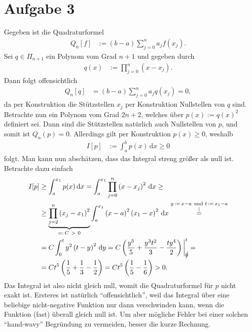 \documentclass[english, parskip=full]{scrartcl}
\newcommand{\kom}{}
\newcommand{\intx}{}
\newcommand{\kla}{}
\newcommand{\tecxt}{}
\begin{document}
\section*{Aufgabe 3}
Gegeben ist die Quadraturformel
\begin{align}
Q_{n}[f]&:= (b-a)\sum_{j=0}^{n}a_jf(x_j).
\end{align}
Sei $q\in\Pi_{n+1}$ ein Polynom vom Grad $n+1$ und gegeben durch 
\begin{align}
q(x) &:=\prod_{j=0}^n \kla\left( x - x_j \right).
\end{align}
Dann folgt offensichtlich
\begin{align}
Q_n[q] &= (b-a)\sum_{j=0}^n a_jq(x_j)  = 0,
\end{align}
da per Konstruktion die Stützstellen $x_j$ per Konstruktion Nullstellen von $q$ sind.
Betrachte nun ein Polynom vom Grad $2n+2$, welches über $p(x):=q(x)^2$ definiert sei.
Dann sind die Stützstellen natürlich auch Nullstellen von $p$, und somit ist $Q_n(p)=0$.
Allerdings gilt per Konstruktion $p(x)\ge 0$, weshalb
\begin{align}
I[p] &:= \intx\int_{a}^{b}p(x)\, \mathrm{d}x\ge 0
\end{align}
folgt.
Man kann nun abschätzen, dass das Integral streng größer als null ist.
Betrachte dazu einfach
\begin{align}
I[p]&\ge\intx\int_{a}^{x_1}p(x)\, \mathrm{d}x = \intx\int_{a}^{x_1}\prod_{j=0}^n\kla\left( x-x_j \right)^2\, \mathrm{d}x \ge \\
&\ge \underbrace{\prod_{j=2}^n \kla\left( x_j - x_1 \right)^2}_{=:\, C\ > \ 0}  \intx\int_{a}^{x_1}\kla\left( x - a \right)^2\kla\left( x_1 - x \right)^2\, \mathrm{d}x \kom\overset{\substack{{y\,:=\,x-a\ \tecxt\text{und } t\,:=\,x_1 - a} \\ |}}{=} \\
&= C\intx\int_{0}^{t}y^2\kla\left( t - y \right)^2\, \mathrm{d}y = C\kla\left( \frac{y^5}{5} + \frac{y^3t^2}{3} - \frac{ty^4}{2} \right)\bigg\vert_{\cancel{0}}^t = \\
&= Ct^5\kla\left( \frac{1}{5}+\frac{1}{3}-\frac{1}{2} \right)=Ct^5\kla\left( \frac{1}{5} - \frac{1}{6} \right) > 0.
\end{align}
Das Integral ist also nicht gleich null, womit die Quadraturformel für $p$ nicht exakt ist.
Ersteres ist natürlich ``offensichtlich'', weil das Integral über eine beliebige nicht-negative Funktion nur dann verschwinden kann, wenn die Funktion (fast) überall gleich null ist.
Um aber mögliche Fehler bei einer solchen ``hand-wavy'' Begründung zu vermeiden, besser die kurze Rechnung.



\end{document}
